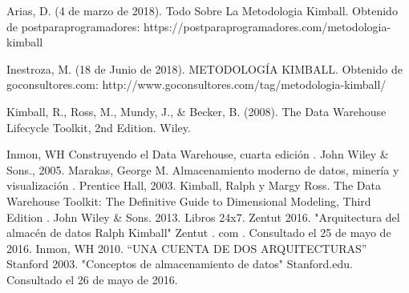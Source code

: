 \documentclass[twoside,twocolumn]{article}
\begin{document}
\begin{thebibliography}{99} 

\bibitem[1]{}
\newblock Arias, D. (4 de marzo de 2018). Todo Sobre La Metodologia Kimball. Obtenido de postparaprogramadores: https://postparaprogramadores.com/metodologia-kimball

\bibitem[2]{}
\newblock Inestroza, M. (18 de Junio de 2018). METODOLOGÍA KIMBALL. Obtenido de goconsultores.com: http://www.goconsultores.com/tag/metodologia-kimball/

\bibitem[3]{}
\newblock Kimball, R., Ross, M., Mundy, J., \& Becker, B. (2008). The Data Warehouse Lifecycle Toolkit, 2nd Edition. Wiley.

\bibitem[4]{}
\newblock Inmon, WH  Construyendo el Data Warehouse, cuarta edición . John Wiley \& Sons., 2005.
\bibitem[5]{}
\newblock Marakas, George M.  Almacenamiento moderno de datos, minería y visualización . Prentice Hall, 2003.
\bibitem[6]{}
\newblock Kimball, Ralph y Margy Ross. The Data Warehouse Toolkit: The Definitive Guide to Dimensional Modeling, Third Edition . John Wiley \& Sons. 2013. Libros 24x7.
\bibitem[7]{}
\newblock Zentut 2016. "Arquitectura del almacén de datos Ralph Kimball" Zentut . com . Consultado el 25 de mayo de 2016. 
\bibitem[8]{}
\newblock Inmon, WH 2010. “UNA CUENTA DE DOS ARQUITECTURAS”
\bibitem[9]{}
\newblock Stanford 2003. "Conceptos de almacenamiento de datos" Stanford.edu. Consultado el 26 de mayo de 2016.

\end{thebibliography}


\end{document}

